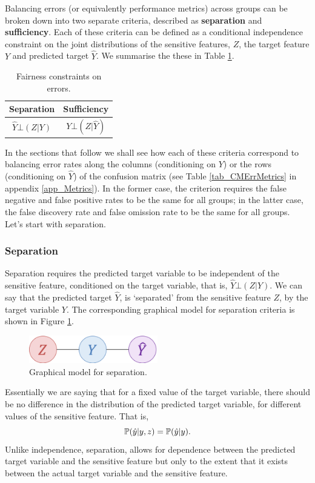 Balancing errors (or equivalently performance metrics) across groups can be broken down into two separate criteria, described as \textbf{separation} and \textbf{sufficiency}\cite{FairMLBook}. Each of these criteria can be defined as a conditional independence constraint on the joint distributions of the sensitive features, $Z$, the target feature $Y$ and predicted target $\hat{Y}$. We summarise the these in Table \ref{tab_FairErrors}.
%
\begin{table}[h!]
\centering
\caption{Fairness constraints on errors.}
\label{tab_FairErrors}
\vspace{10pt}
\begin{tabular}{|c|c|}
\hline
Separation             & Sufficiency            \\
\hline
\hline
$\hat{Y} \bot (Z | Y)$ & $Y \bot (Z | \hat{Y})$ \\
\hline
\end{tabular}
\end{table}
%
In the sections that follow we shall see how each of these criteria correspond to balancing error rates along the columns (conditioning on $Y$) or the rows (conditioning on $\hat{Y}$) of the confusion matrix (see Table \ref{tab_CMErrMetrics} in appendix \ref{app_Metrics}). In the former case, the criterion requires the false negative and false positive rates to be the same for all groups; in the latter case, the false discovery rate and false omission rate to be the same for all groups. Let's start with separation.

\subsubsection*{Separation}

Separation requires the predicted target variable to be independent of the sensitive feature, conditioned on the target variable, that is, $\hat{Y} \bot (Z|Y)$. We can say that the predicted target $\hat{Y}$, is `separated' from the sensitive feature $Z$, by the target variable $Y$. The corresponding graphical model for separation criteria is shown in Figure \ref{fig_separation}.
%
\begin{figure}[h!]
\centering
\includegraphics[width=0.5\textwidth]{03_GroupFairness/figures/Fig_Separation.png}
\caption{Graphical model for separation.}
\label{fig_separation}
\end{figure}
%
Essentially we are saying that for a fixed value of the target variable, there should be no difference in the distribution of the predicted target variable, for different values of the sensitive feature. That is,
\[
\mathbb{P}(\hat{y}|y, z) = \mathbb{P}(\hat{y}|y).
\]
Unlike independence, separation, allows for dependence between the predicted target variable and the sensitive feature but only to the extent that it exists between the actual target variable and the sensitive feature.

